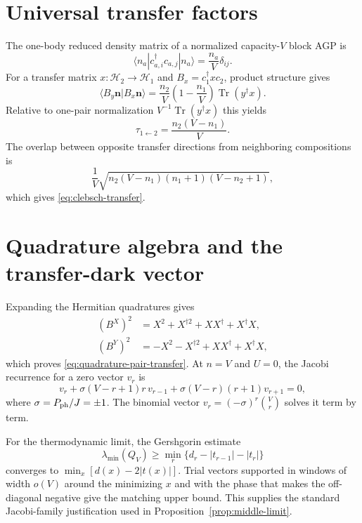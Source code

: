 \documentclass[11pt]{article}
\theoremstyle{remark}
\newcommand{\Tr}{\operatorname{Tr}}
\newcommand{\cH}{\mathcal H}
\begin{document}
\section{Universal transfer factors}
\label{app:transfer}

The one-body reduced density matrix of a normalized capacity-$V$ block AGP is
\begin{equation}
\langle n_a|c_{a,i}^\dagger c_{a,j}|n_a\rangle
=\frac{n_a}{V}\delta_{ij}.
\end{equation}
For a transfer matrix $x:\cH_2\to\cH_1$ and $B_x=c_1^\dagger xc_2$, product structure gives
\begin{equation}
\langle B_y\bm n|B_x\bm n\rangle
=\frac{n_2}{V}\left(1-\frac{n_1}{V}\right)\Tr(y^\dagger x).
\end{equation}
Relative to one-pair normalization $V^{-1}\Tr(y^\dagger x)$ this yields
\begin{equation}
\tau_{1\leftarrow2}=\frac{n_2(V-n_1)}{V}.
\end{equation}
The overlap between opposite transfer directions from neighboring compositions is
\begin{equation}
\frac1V\sqrt{n_2(V-n_1)(n_1+1)(V-n_2+1)},
\end{equation}
which gives \cref{eq:clebsch-transfer}.

\section{Quadrature algebra and the transfer-dark vector}
\label{app:quadrature}

Expanding the Hermitian quadratures gives
\begin{align}
(B^X)^2&=X^2+X^{\dagger2}+XX^\dagger+X^\dagger X,\\
(B^Y)^2&=-X^2-X^{\dagger2}+XX^\dagger+X^\dagger X,
\end{align}
which proves \cref{eq:quadrature-pair-transfer}.  At $n=V$ and $U=0$, the Jacobi recurrence for a zero vector $v_r$ is
\begin{equation}
[(V-r)^2+r^2]v_r
+\sigma(V-r+1)r\,v_{r-1}
+\sigma(V-r)(r+1)v_{r+1}=0,
\end{equation}
where $\sigma=P_{\rm ph}/J=\pm1$.  The binomial vector
$v_r=(-\sigma)^r\binom Vr$ solves it term by term.

For the thermodynamic limit, the Gershgorin estimate
\begin{equation}
\lambda_{\min}(Q_V)\ge
\min_r\{d_r-|t_{r-1}|-|t_r|\}
\end{equation}
converges to $\min_x[d(x)-2|t(x)|]$.  Trial vectors supported in windows of width $o(V)$ around the minimizing $x$ and with the phase that makes the off-diagonal negative give the matching upper bound.  This supplies the standard Jacobi-family justification used in Proposition~\ref{prop:middle-limit}.
\end{document}
